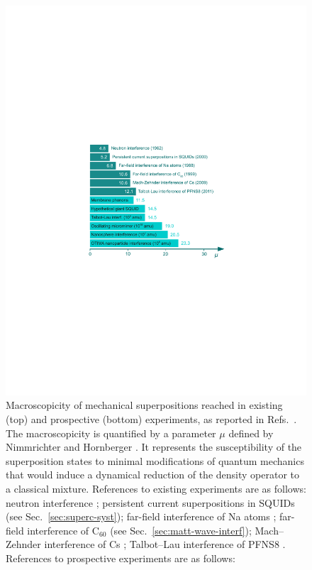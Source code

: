 \documentclass[3p,sort&compress,12pt]{elsarticle}
\begin{document}
\begin{figure}
\centering
\includegraphics[scale=0.76]{macro2.pdf}
\caption{Macroscopicity of mechanical superpositions reached in existing (top) and prospective (bottom) experiments, as reported in Refs.~\cite{Nimmrichter:2013:aa, Arndt:2014:oo}. The macroscopicity is quantified by a parameter $\mu$ defined by Nimmrichter and Hornberger \cite{Nimmrichter:2013:aa}. It represents the susceptibility of the superposition states to minimal modifications of quantum mechanics that would induce a dynamical reduction of the density operator to a classical mixture. References to existing experiments are as follows: neutron interference \cite{Zeilinger:1982:oo}; persistent current superpositions in SQUIDs \cite{Friedman:2000:rr} (see Sec.~\ref{sec:superc-syst}); far-field interference of Na atoms \cite{Keith:1988:uu}; far-field interference of C$_{60}$ \cite{Arndt:1999:rc} (see Sec.~\ref{sec:matt-wave-interf}); Mach--Zehnder interference of Cs \cite{Chung:2009:oo}; Talbot--Lau interference of PFNS8 \cite{Gerlich:2011:aa}. References to prospective experiments are as follows: 
}
\end{figure}
\end{document}
